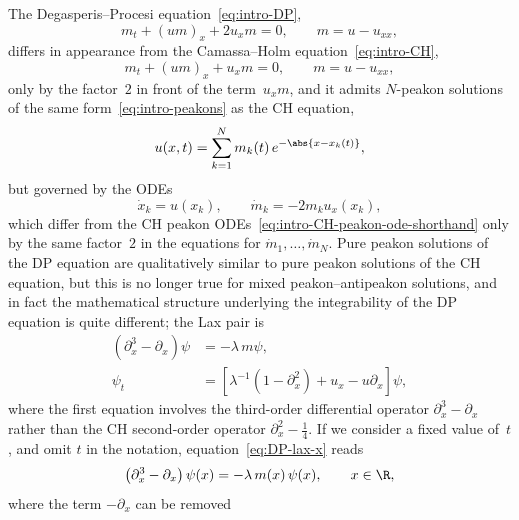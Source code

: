 \documentclass[10pt,a4paper]{article} \pdfoutput=1 
\begin{document}
The Degasperis--Procesi equation~\eqref{eq:intro-DP},
\begin{equation*}
  m_t + (u m)_x + 2 u_x m = 0
  ,\qquad
  m = u - u_{xx}
  ,
\end{equation*}
differs in appearance from the Camassa--Holm equation~\eqref{eq:intro-CH},
\begin{equation*}
  m_t + (u m)_x + u_x m = 0
  ,\qquad
  m = u - u_{xx}
  ,
\end{equation*}
only by the factor~$2$ in front of the term~$u_x m$,
and it admits $N$-peakon solutions of the same form~\eqref{eq:intro-peakons}
as the CH equation,
\begin{equation*}
  u(x,t) = \sum_{k=1}^N m_k(t) \, e^{-\abs{x - x_k(t)}}
  ,
\end{equation*}
but governed by the ODEs
\begin{equation}
  \label{eq:DP-peakon-ode-again}
  \dot x_k = u(x_k)
  ,\qquad
  \dot m_k = -2 m_k u_x(x_k)
  ,
\end{equation}
which differ from the CH peakon ODEs~\eqref{eq:intro-CH-peakon-ode-shorthand}
only by the same factor~$2$ in the equations for $\dot m_1, \dots, \dot m_N$.
Pure peakon solutions of the DP equation are qualitatively similar
to pure peakon solutions of the CH equation,
but this is no longer true for mixed peakon--antipeakon solutions,
and in fact the mathematical structure underlying the integrability of the DP equation
is quite different;
the Lax pair is
\begin{subequations}
  \label{eq:DP-lax}
  \begin{align}
    \label{eq:DP-lax-x}
    (\partial_x^3 - \partial_x) \psi &= -\lambda \, m\psi
    , \\
    \label{eq:DP-lax-t}
    \psi_t &= \left[ \lambda^{-1} (1-\partial_x^2) + u_x - u \partial_x \right] \psi
    ,
  \end{align}
\end{subequations}
where the first equation involves the third-order differential operator
$\partial_x^3 - \partial_x$
rather than the CH second-order operator $\partial_x^2 - \tfrac14$.
If we consider a fixed value of~$t$, and omit $t$ in the notation,
equation~\eqref{eq:DP-lax-x} reads
\begin{equation}
  \label{eq:DP-lax-x-again}
  \bigl( \partial_x^3 - \partial_x \bigr) \, \psi(x) = - \lambda \, m(x) \, \psi(x)
  ,
  \qquad
  x \in \R
  ,
\end{equation}
where the term $-\partial_x$ can be removed~\cite{lundmark-szmigielski:2003:DPshort,lundmark-szmigielski:2005:DPlong}
\end{document}
